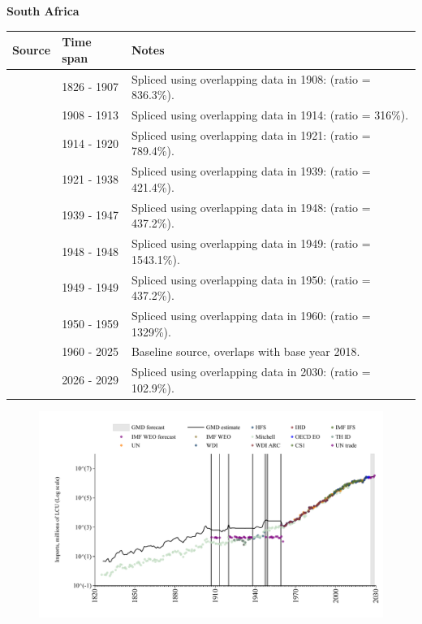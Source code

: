 \documentclass[12pt,a4paper,landscape]{article}
\begin{document}
\begin{adjustbox}{max totalsize={\paperwidth}{\paperheight},center}
\begin{minipage}[t][\textheight][t]{\textwidth}
\vspace*{0.5cm}
{}
\begin{center}
{\Large\bfseries South Africa}
\end{center}
\vspace{0.5cm}
\begin{table}[H]
\centering
\small
\begin{tabular}{|l|l|l|}
\hline
\textbf{Source} & \textbf{Time span} & \textbf{Notes} \\
\hline
\rowcolor{white}\cite{Mitchell}& 1826 - 1907 &Spliced using overlapping data in 1908: (ratio = 836.3\%).\\
\rowcolor{lightgray}\cite{UN_trade}& 1908 - 1913 &Spliced using overlapping data in 1914: (ratio = 316\%).\\
\rowcolor{white}\cite{Mitchell}& 1914 - 1920 &Spliced using overlapping data in 1921: (ratio = 789.4\%).\\
\rowcolor{lightgray}\cite{UN_trade}& 1921 - 1938 &Spliced using overlapping data in 1939: (ratio = 421.4\%).\\
\rowcolor{white}\cite{Mitchell}& 1939 - 1947 &Spliced using overlapping data in 1948: (ratio = 437.2\%).\\
\rowcolor{lightgray}\cite{UN_trade}& 1948 - 1948 &Spliced using overlapping data in 1949: (ratio = 1543.1\%).\\
\rowcolor{white}\cite{Mitchell}& 1949 - 1949 &Spliced using overlapping data in 1950: (ratio = 437.2\%).\\
\rowcolor{lightgray}\cite{UN_trade}& 1950 - 1959 &Spliced using overlapping data in 1960: (ratio = 1329\%).\\
\rowcolor{white}\cite{OECD_EO}& 1960 - 2025 &Baseline source, overlaps with base year 2018.\\
\rowcolor{lightgray}\cite{IMF_WEO_forecast}& 2026 - 2029 &Spliced using overlapping data in 2030: (ratio = 102.9\%).\\
\hline
\end{tabular}
\end{table}
\begin{figure}[H]
\centering
\includegraphics[width=\textwidth,height=0.6\textheight,keepaspectratio]{graphs/ZAF_imports.pdf}

\end{figure}
\end{minipage}
\end{adjustbox}
\end{document}
